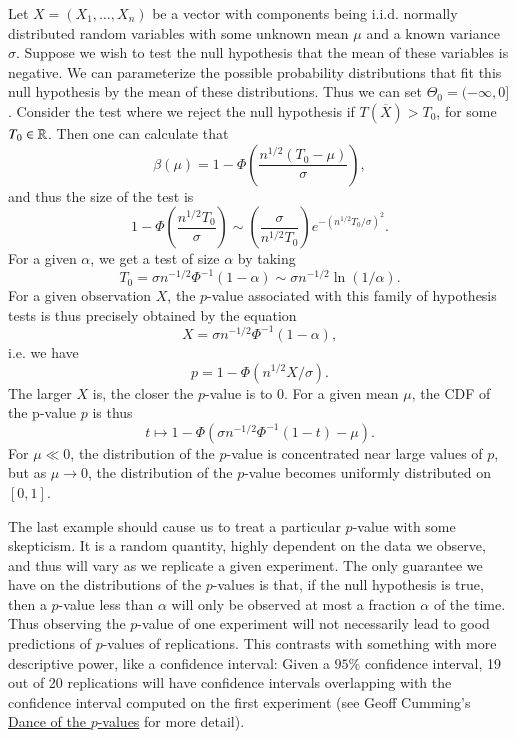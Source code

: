 \begin{example}
	Let $X = (X_1,\dots,X_n)$ be a vector with components being i.i.d. normally distributed random variables with some unknown mean $\mu$ and a known variance $\sigma$. Suppose we wish to test the null hypothesis that the mean of these variables is negative. We can parameterize the possible probability distributions that fit this null hypothesis by the mean of these distributions. Thus we can set $\Theta_0 = (-\infty,0]$. Consider the test where we reject the null hypothesis if $T(\overline{X}) > T_0$, for some  $T_0 \in \operatorname{\mathbb{R}}$. Then one can calculate that
	\[ \beta(\mu) = 1 - \Phi \left( \frac{n^{1/2}(T_0 - \mu)}{\sigma} \right), \]
	and thus the size of the test is
	\[ 1 - \Phi \left( \frac{n^{1/2} T_0}{\sigma} \right) \sim \left( \frac{\sigma}{n^{1/2} T_0} \right) e^{- ( n^{1/2} T_0/\sigma)^2}. \]
	For a given $\alpha$, we get a test of size $\alpha$ by taking
	\[ T_0 = \sigma n^{-1/2} \Phi^{-1}(1 - \alpha) \sim \sigma n^{-1/2} \ln \left( 1/\alpha \right) . \]
	For a given observation $X$, the $p$-value associated with this family of hypothesis tests is thus precisely obtained by the equation
	\[ X = \sigma n^{-1/2} \Phi^{-1}(1 - \alpha), \]
	i.e. we have
	\[ p = 1 - \Phi(n^{1/2} X / \sigma). \]
	The larger $X$ is, the closer the $p$-value is to $0$. For a given mean $\mu$, the CDF of the p-value $p$ is thus
	\[ t \mapsto 1 - \Phi( \sigma n^{-1/2} \Phi^{-1}(1 - t) - \mu ). \]
	For $\mu \ll 0$, the distribution of the $p$-value is concentrated near large values of $p$, but as $\mu \to 0$, the distribution of the $p$-value becomes uniformly distributed on $[0,1]$.
\end{example}

The last example should cause us to treat a particular $p$-value with some skepticism. It is a random quantity, highly dependent on the data we observe, and thus will vary as we replicate a given experiment. The only guarantee we have on the distributions of the $p$-values is that, if the null hypothesis is true, then a $p$-value less than $\alpha$ will only be observed at most a fraction $\alpha$ of the time. Thus observing the $p$-value of one experiment will not necessarily lead to good predictions of $p$-values of replications. This contrasts with something with more descriptive power, like a confidence interval: Given a $95\%$ confidence interval, 19 out of 20 replications will have confidence intervals overlapping with the confidence interval computed on the first experiment (see Geoff Cumming's \href{https://www.youtube.com/watch?v=5OL1RqHrZQ8&ab_channel=GeoffCumming}{Dance of the $p$-values} for more detail).

